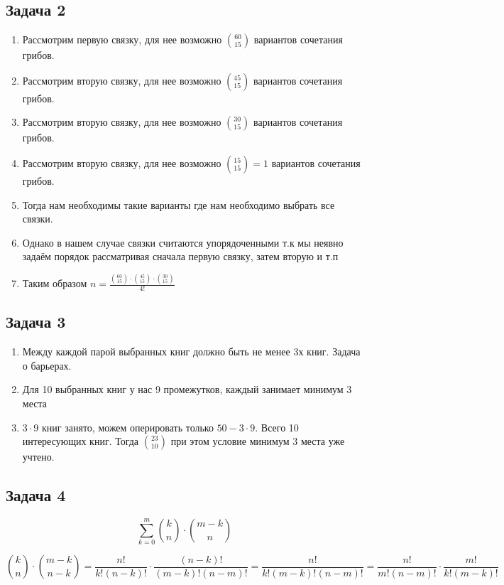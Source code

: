 \documentclass[a4paper,12pt]{article}
\begin{document}
\subsection{Задача 2}
\begin{enumerate}
    \item Рассмотрим первую связку, для нее возможно $\binom{60}{15}$ вариантов сочетания грибов.
    \item Рассмотрим вторую связку, для нее возможно $\binom{45}{15}$ вариантов сочетания грибов.
    \item Рассмотрим вторую связку, для нее возможно $\binom{30}{15}$ вариантов сочетания грибов.
    \item Рассмотрим вторую связку, для нее возможно $\binom{15}{15}=1$ вариантов сочетания грибов.
    \item Тогда нам необходимы такие варианты где нам необходимо выбрать все связки.
    \item Однако в нашем случае связки считаются упорядоченными т.к мы неявно задаём порядок рассматривая сначала первую связку, затем вторую и т.п
    \item Таким образом $n = \frac{\binom{60}{15} \cdot \binom{45}{15} \cdot \binom{30}{15}}{4!}$
\end{enumerate}


\subsection{Задача 3}
\begin{enumerate}
    \item Между каждой парой выбранных книг должно быть не менее 3х книг. Задача о барьерах.
    \item Для 10 выбранных книг у нас 9 промежутков, каждый занимает минимум 3 места
    \item $3\cdot 9$ книг занято, можем оперировать только $50-3\cdot 9$. Всего 10 интересующих книг. Тогда $\binom{23}{10}$ при этом условие минимум 3 места уже учтено.
\end{enumerate}

\subsection{Задача 4}
\[
\sum_{k=0}^{m} \binom{k}{n}\cdot\binom{m-k}{n} 
\]

\[
\binom{k}{n}\cdot \binom{m-k}{n-k} = \frac{n!}{k!(n-k)!}\cdot \frac{(n-k)!}{(m-k)!(n-m)!}=\frac{n!}{k!(m-k)!(n-m)!} = \frac{n!}{m!(n-m)!}\cdot \frac{m!}{k!(m-k)!}
\]
\end{document}
